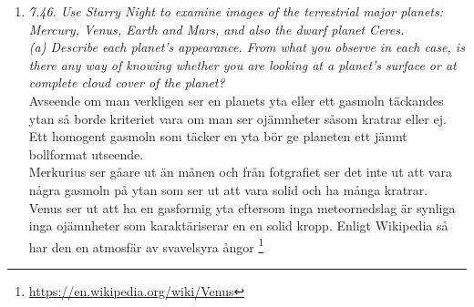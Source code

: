 \documentclass[./exercises.tex]{subfiles}
\begin{document}
\begin{enumerate}
Förväntan är att ljuset från Andromeda har ett kontiniuerligt spektrum men eftersom Andromeda är så långt bort
så är sannolikheten stor att det finns kalla partikel moln\footnote{Observing Emission/Absorption Lines in Astronomy,\url{https://www.youtube.com/watch?v=lPDY5jiBxJk}} som ljuset passerar på väg till jorden vilket ger
upphov till excitation och absorption där absorption är dominerande eftersom emission kan ske ialla riktningar.
Ljuset från månen är samma bredbandiga ljus som når jorden. Eftersom månen uppfattas som vit så innebär det
att månens yta har ungefär samma reflektionskoefficient för samtliga frekevenser i det optiska spektrat.

M8 galaxen har klassificerats som en emissions galax och en HII-region\footnote{\url{https://en.wikipedia.org/wiki/Lagoon_Nebula}} vilket betyder att det finns
mycket joniserat väte uppenbarligen förväntas ett emissionsspektrum i från vätet.

Att fotografier av M8 blir rosafärgade innebär att effekttätheten är högst omkring 700nm.\\





\item \textit{7.46. Use Starry Night to examine images of the
terrestrial major planets: Mercury, Venus, Earth
and Mars, and also the dwarf planet Ceres.}\\

\textit{(a) Describe each planet’s appearance. From what you observe in each case, is there any way of
knowing whether you are looking at a planet’s surface or at complete cloud cover of the planet?}\\

Avseende om man verkligen ser en planets yta eller ett gasmoln täckandes ytan så borde kriteriet vara
om man ser ojämnheter såsom kratrar eller ej.
 Ett homogent gasmoln som täcker en yta bör ge planeten ett jämnt
bollformat utseende.\\

Merkurius ser gåare ut än månen och från fotgrafiet ser det inte ut att vara några gasmoln på ytan som ser 
ut att vara solid och ha många kratrar.\\

Venus ser ut att ha en gasformig yta eftersom inga meteornedslag är synliga inga ojämnheter
som karaktäriserar en en solid kropp. Enligt Wikipedia så har den en atmosfär av svavelsyra ångor
\footnote{\url{https://en.wikipedia.org/wiki/Venus}}\\


\end{enumerate}
\end{document}
